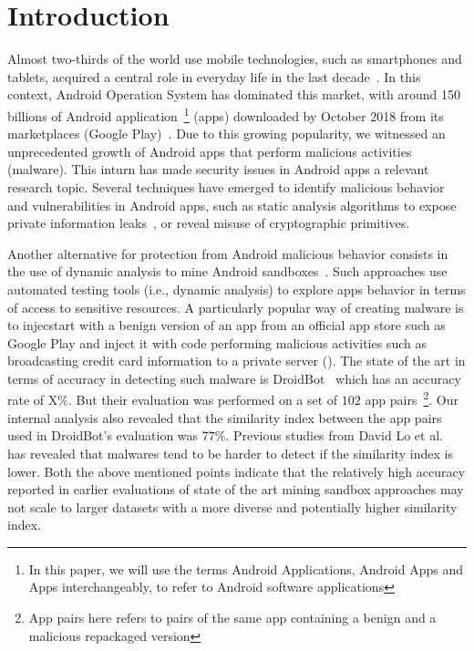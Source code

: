 \section{Introduction}\label{sec:introduction}

Almost two-thirds of the world use mobile technologies, such as smartphones and tablets, acquired a central role in everyday life in the last decade~\cite{Comscore}\cite{DBLP:journals/tse/MartinSJZH17}. In this context, Android Operation System has dominated this market, with around 150 billions of Android application~\footnote{In this paper, we will use the terms Android Applications, Android Apps and Apps interchangeably, to refer to Android software applications} (apps) downloaded by October 2018  from its marketplaces (Google Play)~\cite{Statista}. Due to this growing popularity, we witnessed an unprecedented growth of  Android apps that perform malicious activities (malware).  This inturn has made security issues in Android apps a relevant research topic. Several techniques have emerged to identify malicious behavior and vulnerabilities in Android apps, such as static analysis algorithms to expose private information leaks~\cite{DBLP:conf/pldi/ArztRFBBKTOM14}, or reveal misuse of 
cryptographic primitives.~\cite{DBLP:journals/tse/KrugerSABM21}

Another alternative for protection from Android malicious behavior consists in the use of dynamic analysis to mine Android sandboxes~\cite{DBLP:conf/icse/JamrozikSZ16}. Such approaches use automated testing tools (i.e., dynamic analysis) to explore apps behavior in terms of access to sensitive resources. A particularly popular way of creating malware is to injecstart with a benign version of an app from an official app store such as Google Play and inject it with code performing malicious activities such as broadcasting credit card information to a private server (). The state of the art in terms of accuracy in detecting such malware is DroidBot~\cite{DBLP:conf/icse/LiYGC17} which has an accuracy rate of X\%. But their evaluation was performed on a set of $102$ app pairs~\footnote{App pairs here refers to pairs of the same app containing a benign and a malicious repackaged version}. Our internal analysis also revealed that the similarity index between the app pairs used in DroidBot's evaluation was $77\%$. Previous studies from David Lo et al.~\cite{DBLP:conf/wcre/BaoLL18} has revealed that malwares tend to be harder to detect if the similarity index is lower. Both the above mentioned points indicate that the relatively high accuracy reported in earlier evaluations of state of the art mining sandbox approaches may not scale to larger datasets with a more diverse and potentially higher similarity index.

